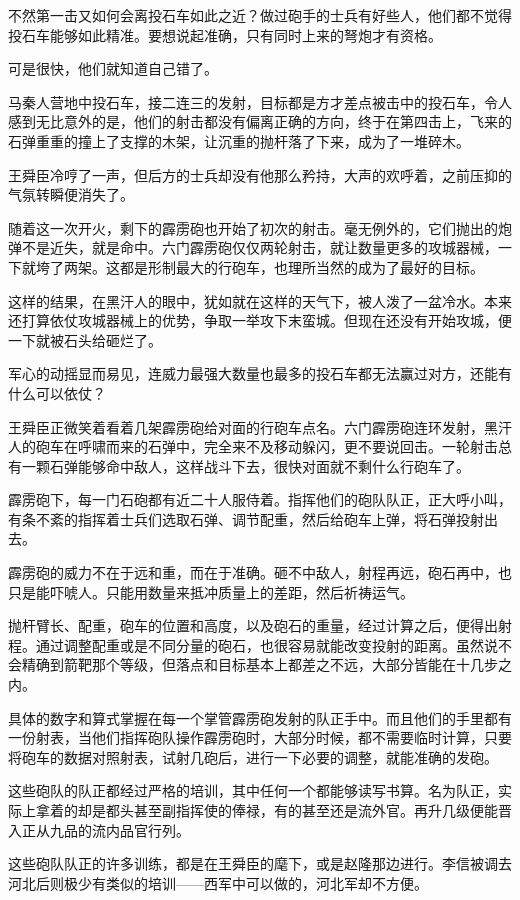 不然第一击又如何会离投石车如此之近？做过砲手的士兵有好些人，他们都不觉得投石车能够如此精准。要想说起准确，只有同时上来的弩炮才有资格。

可是很快，他们就知道自己错了。

马秦人营地中投石车，接二连三的发射，目标都是方才差点被击中的投石车，令人感到无比意外的是，他们的射击都没有偏离正确的方向，终于在第四击上，飞来的石弹重重的撞上了支撑的木架，让沉重的抛杆落了下来，成为了一堆碎木。

王舜臣冷哼了一声，但后方的士兵却没有他那么矜持，大声的欢呼着，之前压抑的气氛转瞬便消失了。

随着这一次开火，剩下的霹雳砲也开始了初次的射击。毫无例外的，它们抛出的炮弹不是近失，就是命中。六门霹雳砲仅仅两轮射击，就让数量更多的攻城器械，一下就垮了两架。这都是形制最大的行砲车，也理所当然的成为了最好的目标。

这样的结果，在黑汗人的眼中，犹如就在这样的天气下，被人泼了一盆冷水。本来还打算依仗攻城器械上的优势，争取一举攻下末蛮城。但现在还没有开始攻城，便一下就被石头给砸烂了。

军心的动摇显而易见，连威力最强大数量也最多的投石车都无法赢过对方，还能有什么可以依仗？

王舜臣正微笑着看着几架霹雳砲给对面的行砲车点名。六门霹雳砲连环发射，黑汗人的砲车在呼啸而来的石弹中，完全来不及移动躲闪，更不要说回击。一轮射击总有一颗石弹能够命中敌人，这样战斗下去，很快对面就不剩什么行砲车了。

霹雳砲下，每一门石砲都有近二十人服侍着。指挥他们的砲队队正，正大呼小叫，有条不紊的指挥着士兵们选取石弹、调节配重，然后给砲车上弹，将石弹投射出去。

霹雳砲的威力不在于远和重，而在于准确。砸不中敌人，射程再远，砲石再中，也只是能吓唬人。只能用数量来抵冲质量上的差距，然后祈祷运气。

抛杆臂长、配重，砲车的位置和高度，以及砲石的重量，经过计算之后，便得出射程。通过调整配重或是不同分量的砲石，也很容易就能改变投射的距离。虽然说不会精确到箭靶那个等级，但落点和目标基本上都差之不远，大部分皆能在十几步之内。

具体的数字和算式掌握在每一个掌管霹雳砲发射的队正手中。而且他们的手里都有一份射表，当他们指挥砲队操作霹雳砲时，大部分时候，都不需要临时计算，只要将砲车的数据对照射表，试射几砲后，进行一下必要的调整，就能准确的发砲。

这些砲队的队正都经过严格的培训，其中任何一个都能够读写书算。名为队正，实际上拿着的却是都头甚至副指挥使的俸禄，有的甚至还是流外官。再升几级便能晋入正从九品的流内品官行列。

这些砲队队正的许多训练，都是在王舜臣的麾下，或是赵隆那边进行。李信被调去河北后则极少有类似的培训——西军中可以做的，河北军却不方便。

